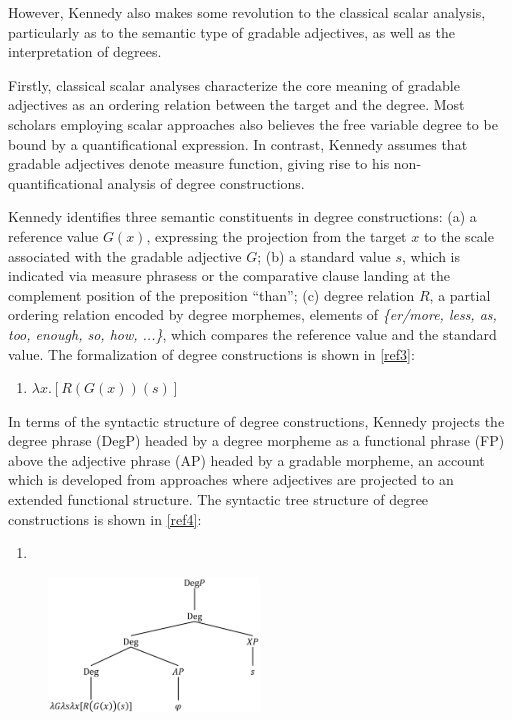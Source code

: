 \documentclass{ctexart}
\let \cite \parencite
\begin{document}
However, Kennedy also makes some revolution to the classical scalar analysis, particularly as to the semantic type of gradable adjectives, as well as the interpretation of degrees.

Firstly, classical scalar analyses characterize the core meaning of gradable adjectives as an ordering relation between the target and the degree. Most scholars employing scalar approaches also believes the free variable degree to be bound by a quantificational expression\cite{hellan1981,hoeksema1983,von1984a}. In contrast, Kennedy assumes that gradable adjectives denote measure function, giving rise to his non-quantificational analysis of degree constructions.

Kennedy identifies three semantic constituents in degree constructions\cite{russell1905}: (a) a reference value $G(x)$, expressing the projection from the target $x$ to the scale associated with the gradable adjective $G$; (b) a standard value $s$, which is indicated via measure phrasess or the comparative clause landing at the complement position of the preposition “than”; (c) degree relation $R$, a partial ordering relation encoded by degree morphemes, elements of \textit{\{er/more, less, as, too, enough, so, how, ...\}}, which compares the reference value and the standard value. The formalization of degree constructions is shown in \ref{ref3}:

\begin{enumerate}[resume]
\item \label{ref3} $\lambda x.[R(G(x))(s)]$
\end{enumerate}

In terms of the syntactic structure of degree constructions, Kennedy projects the degree phrase (DegP) headed by a degree morpheme as a functional phrase (FP) above the adjective phrase (AP) headed by a gradable morpheme, an account which is developed from approaches where adjectives are projected to an extended functional structure\cite{abney1987,corver1990,corver1997b,grimshaw1991}. The syntactic tree structure of degree constructions is shown in \ref{ref4}:

\begin{enumerate}[resume]
\item \label{ref4}
\end{enumerate}

\begin{figure}[h]
\centering
\includegraphics[width=0.5\textwidth]{pic/pic1.png}
\end{figure}
\end{document}
